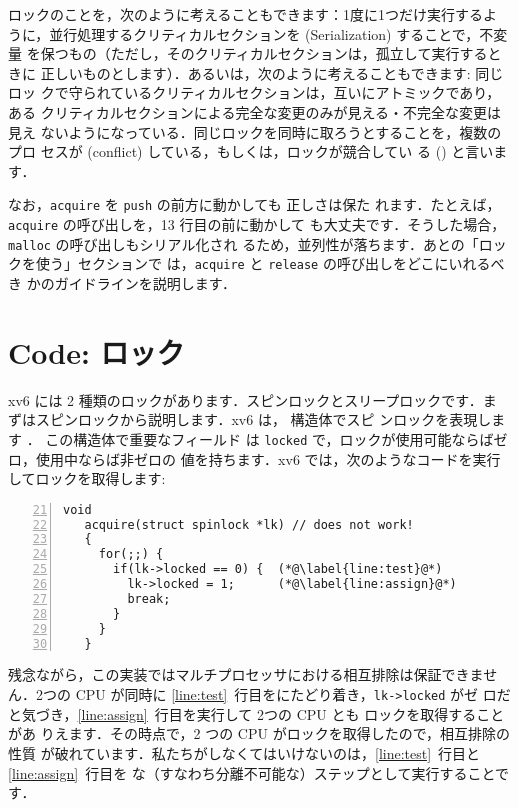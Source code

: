 ロックのことを，次のように考えることもできます：1度に1つだけ実行するよ
うに，並行処理するクリティカルセクションを (Serialization) することで，不変量
を保つもの（ただし，そのクリティカルセクションは，孤立して実行するときに
正しいものとします）．あるいは，次のように考えることもできます: 同じロッ
クで守られているクリティカルセクションは，互いにアトミックであり，ある
クリティカルセクションによる完全な変更のみが見える・不完全な変更は見え
ないようになっている．同じロックを同時に取ろうとすることを，複数のプロ
セスが (conflict) している，もしくは，ロックが競合してい
る () と言います．

なお，\lstinline{acquire} を \lstinline{push} の前方に動かしても 正しさは保た
れます．たとえば，\lstinline{acquire} の呼び出しを，13 行目の前に動かして
も大丈夫です．そうした場合，\lstinline{malloc} の呼び出しもシリアル化され
るため，並列性が落ちます．あとの「ロックを使う」セクションで
は，\lstinline{acquire} と \lstinline{release} の呼び出しをどこにいれるべき
かのガイドラインを説明します．

\section{Code: ロック}
xv6 には 2 種類のロックがあります．スピンロックとスリープロックです．ま
ずはスピンロックから説明します．xv6 は， 構造体でスピ
ンロックを表現します
．
この構造体で重要なフィールド
は \lstinline{locked} で，ロックが使用可能ならばゼロ，使用中ならば非ゼロの
値を持ちます．xv6 では，次のようなコードを実行してロックを取得します:
\begin{lstlisting}[numbers=left,firstnumber=21]
   void
   acquire(struct spinlock *lk) // does not work!
   {
     for(;;) {
       if(lk->locked == 0) {  (*@\label{line:test}@*)
         lk->locked = 1;      (*@\label{line:assign}@*)
         break;
       }
     }
   }
\end{lstlisting}
残念ながら，この実装ではマルチプロセッサにおける相互排除は保証できませ
ん．2つの CPU が同時に \ref{line:test}~行目をにたどり着き，\lstinline{lk->locked} がゼ
ロだと気づき，\ref{line:assign}~行目を実行して 2つの CPU とも ロックを取得することがあ
りえます．その時点で，2 つの CPU がロックを取得したので，相互排除の性質
が破れています．私たちがしなくてはいけないのは，\ref{line:test}~行目と \ref{line:assign}~行目を
な（すなわち分離不可能な）ステップとして実行することです．

